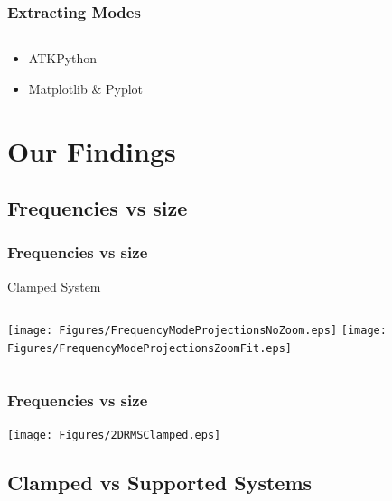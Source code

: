 \documentclass[hyperref={colorlinks=true,urlcolor=blue,linkcolor=.},aspectratio=1610,mathserif]{beamer}
\begin{document}
\begin{frame}
 \frametitle{Extracting Modes}
 \begin{listing}[H]
  \inputminted[python3=true,bgcolor=Black,linenos=true,firstline=66,lastline=71,breaklines=true,breakautoindent=true]{python}{VNL/PythonScripts/Scripts/2DdataExtract.py}
 \end{listing}
 \begin{itemize}[<+->]
  \pause
  \item ATKPython
  \item Matplotlib \& Pyplot
 \end{itemize}
\end{frame}

\section{Our Findings}

\subsection{Frequencies vs size}

\begin{frame}
 \frametitle{Frequencies vs size}
 \begin{center}
  Clamped System
 \end{center}
 \begin{columns}[T]
  \texttt{[image: Figures/FrequencyModeProjectionsNoZoom.eps]}
  \texttt{[image: Figures/FrequencyModeProjectionsZoomFit.eps]}
 \end{columns}
\end{frame}

\begin{frame}
 \frametitle{Frequencies vs size}
 \begin{center}
  \texttt{[image: Figures/2DRMSClamped.eps]}
 \end{center}
\end{frame}

\subsection{Clamped vs Supported Systems}
\end{document}
